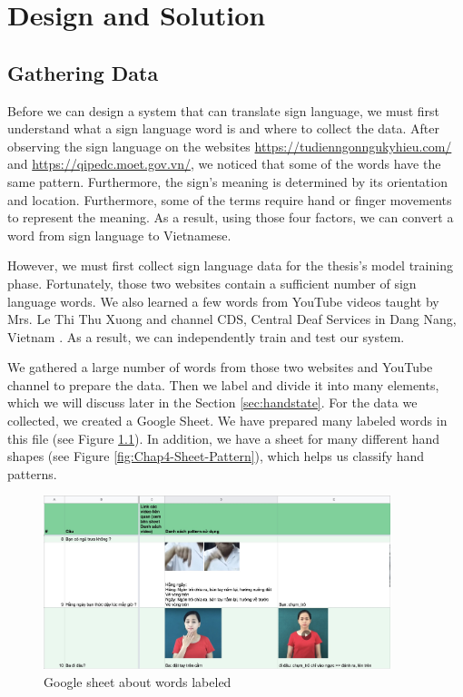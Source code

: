 \chapter{Design and Solution}
\section{Gathering Data}



Before we can design a system that can translate sign language, we must first understand what a sign language word is and where to collect the data. After observing the sign language on the websites \url{https://tudienngonngukyhieu.com/} and \url{https://qipedc.moet.gov.vn/}, we noticed that some of the words have the same pattern. Furthermore, the sign's meaning is determined by its orientation and location. Furthermore, some of the terms require hand or finger movements to represent the meaning. As a result, using those four factors, we can convert a word from sign language to Vietnamese.

However, we must first collect sign language data for the thesis's model training phase. Fortunately, those two websites contain a sufficient number of sign language words. We also learned a few words from YouTube videos taught by Mrs. Le Thi Thu Xuong \cite{yt:LeThiThuXuong} and channel CDS, Central Deaf Services in Dang Nang, Vietnam \cite{yt:CDS}. As a result, we can independently train and test our system.

We gathered a large number of words from those two websites and YouTube channel to prepare the data. Then we label and divide it into many elements, which we will discuss later in the Section \ref{sec:handstate}. For the data we collected, we created a Google Sheet. We have prepared many labeled words in this file (see Figure \ref{fig:Chap4-Label-Word}). In addition, we have a sheet for many different hand shapes (see Figure \ref{fig:Chap4-Sheet-Pattern}), which helps us classify hand patterns.

\begin{figure}[H]
	\centering
	\includegraphics[width=0.9\textwidth]{img/Chap4/Label-Word.jpg}
	\caption{Google sheet about words labeled}
	\label{fig:Chap4-Label-Word}
\end{figure}

